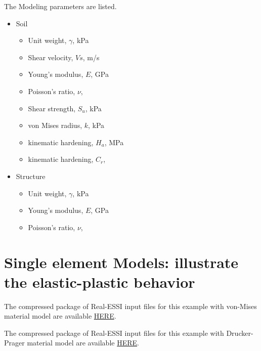 The Modeling parameters are listed.
\begin{itemize}
  \item Soil 
  \begin{itemize}
    \item Unit weight, $\gamma$, \enspace {} kPa
    \item Shear velocity, $Vs$, \enspace {} m/s
    \item Young's modulus, $E$, \enspace {} GPa
    \item Poisson's ratio, $\nu$, \enspace {}
    \item Shear strength, $S_u$, \enspace {} kPa
    \item von Mises radius, $k$, \enspace {} kPa
    \item kinematic hardening, $H_a$, \enspace {} MPa
    \item kinematic hardening, $C_r$, \enspace {}
  \end{itemize}
  \item Structure
  \begin{itemize}
    \item Unit weight, $\gamma$, \enspace {} kPa
    \item Young's modulus, $E$, \enspace {} GPa
    \item Poisson's ratio, $\nu$, \enspace {}
  \end{itemize}
\end{itemize}

\clearpage
\newpage
\section{Single element Models: illustrate the elastic-plastic behavior}
\label{Single_element_Models_illustrate_the_elastic-plastic_behavior}

The compressed package of Real-ESSI input files for this example with von-Mises material model are available 
\href{http://sokocalo.engr.ucdavis.edu/~jeremic/lecture_notes_online_material/_Chapter_Short_Course_Examples/Day1/Single_element_Models_illustrate_the_elastic-plastic_behavior/vonMises/_all_files_packaged_for_vonMises.tar.gz}{HERE}. 

The compressed package of Real-ESSI input files for this example with Drucker-Prager material model are available 
\href{http://sokocalo.engr.ucdavis.edu/~jeremic/lecture_notes_online_material/_Chapter_Short_Course_Examples/Day1/Single_element_Models_illustrate_the_elastic-plastic_behavior/DruckerPrager/_all_files_packaged_for_DruckerPrager.tar.gz}{HERE}. 



